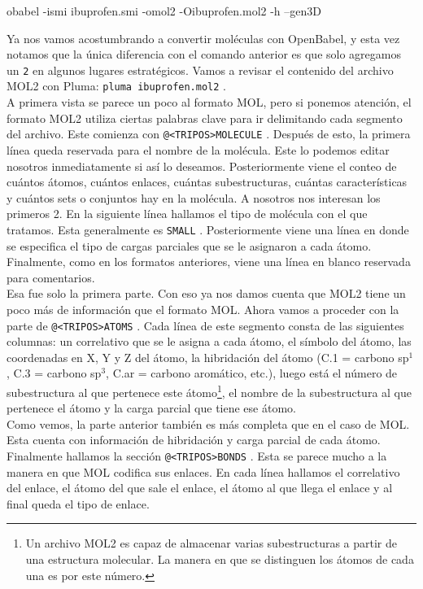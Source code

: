 \documentclass[10pt,letterpaper]{article}
\newcommand{\inlinecode}[1]{
\colorbox{light-gray}{\texttt{#1}}
}
\newenvironment{Code}
{
\begin{lrbox}{\selvestebox}%
\begin{minipage}{\dimexpr\columnwidth-2\fboxsep\relax}
\fontfamily{\ttdefault}\selectfont
}
{\end{minipage}\end{lrbox}%
\begin{center}
\colorbox{light-gray}{\usebox{\selvestebox}}
\end{center}
}
\begin{document}
\begin{Code}
obabel -ismi ibuprofen.smi -omol2 -Oibuprofen.mol2 -h --gen3D
\end{Code}

Ya nos vamos acostumbrando a convertir mol\'eculas con OpenBabel, y esta vez notamos que la \'unica diferencia con el comando anterior es que solo agregamos un \inlinecode{2} en algunos lugares estrat\'egicos. Vamos a revisar el contenido del archivo MOL2 con Pluma: \inlinecode{pluma ibuprofen.mol2}.\\

A primera vista se parece un poco al formato MOL, pero si ponemos atenci\'on, el formato MOL2 utiliza ciertas palabras clave para ir delimitando cada segmento del archivo. Este comienza con \inlinecode{@<TRIPOS>MOLECULE}. Despu\'es de esto, la primera l\'inea queda reservada para el nombre de la mol\'ecula. Este lo podemos editar nosotros inmediatamente si as\'i lo deseamos. Posteriormente viene el conteo de cu\'antos \'atomos, cu\'antos enlaces, cu\'antas subestructuras, cu\'antas caracter\'isticas y cu\'antos sets o conjuntos hay en la mol\'ecula. A nosotros nos interesan los primeros 2. En la siguiente l\'inea hallamos el tipo de mol\'ecula con el que tratamos. Esta generalmente es \inlinecode{SMALL}. Posteriormente viene una l\'inea en donde se especifica el tipo de cargas parciales que se le asignaron a cada \'atomo. Finalmente, como en los formatos anteriores, viene una l\'inea en blanco reservada para comentarios.\\

Esa fue solo la primera parte. Con eso ya nos damos cuenta que MOL2 tiene un poco m\'as de informaci\'on que el formato MOL. Ahora vamos a proceder con la parte de \inlinecode{@<TRIPOS>ATOMS}. Cada l\'inea de este segmento consta de las siguientes columnas: un correlativo que se le asigna a cada \'atomo, el s\'imbolo del \'atomo, las coordenadas en X, Y y Z del \'atomo, la hibridaci\'on del \'atomo (C.1 = carbono sp$^1$, C.3 = carbono sp$^3$, C.ar = carbono arom\'atico, etc.), luego est\'a el n\'umero de subestructura al que pertenece este \'atomo\footnote{Un archivo MOL2 es capaz de almacenar varias subestructuras a partir de una estructura molecular. La manera en que se distinguen los \'atomos de cada una es por este n\'umero.}, el nombre de la subestructura al que pertenece el \'atomo y la carga parcial que tiene ese \'atomo.\\

Como vemos, la parte anterior tambi\'en es m\'as completa que en el caso de MOL. Esta cuenta con informaci\'on de hibridaci\'on y carga parcial de cada \'atomo. Finalmente hallamos la secci\'on \inlinecode{@<TRIPOS>BONDS}. Esta se parece mucho a la manera en que MOL codifica sus enlaces. En cada l\'inea hallamos el correlativo del enlace, el \'atomo del que sale el enlace, el \'atomo al que llega el enlace y al final queda el tipo de enlace.\\
\end{document}
